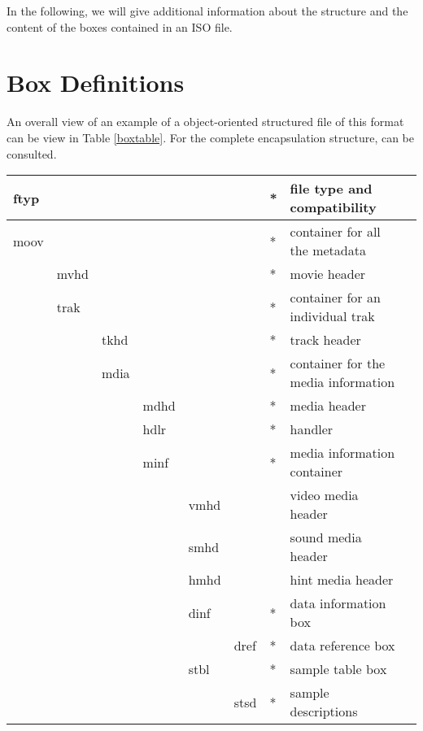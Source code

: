 In the following, we will give additional information about the structure and the content of the boxes contained in an ISO file.

\section{Box Definitions}

An overall view of an example of a object-oriented structured file of this format can be view in Table \ref{boxtable}. For the complete encapsulation structure, \cite{iso} can be consulted.

\begin{table}[]
\centering
\begin{tabular}{|l|l|l|l|l|l|l|l|l}
\hline
  ftyp &      &      &      &      &      & * & file type and compatibility\\ \hline
  moov &      &      &      &      &      & * & container for all the metadata \\ \hline
       & mvhd &      &      &      &      & * & movie header \\ \hline
       & trak &      &      &      &      & * & container for an individual trak \\ \hline
       &      & tkhd &      &      &      & * & track header\\ \hline
       &      & mdia &      &      &      & * & container for the media information \\ \hline
       &      &      & mdhd &      &      & * & media header \\ \hline
       &      &      & hdlr &      &      & * & handler \\ \hline
       &      &      & minf &      &      & * & media information container \\ \hline
       &      &      &      & vmhd &      &   & video media header \\ \hline
       &      &      &      & smhd &      &   & sound media header \\ \hline
       &      &      &      & hmhd &      &   & hint media header \\ \hline
       &      &      &      & dinf &      & * & data information box \\ \hline
       &      &      &      &      & dref & * & data reference box \\ \hline
       &      &      &      & stbl &      & * & sample table box \\ \hline
       &      &      &      &      & stsd & * & sample descriptions \\ \hline

\end{tabular}
\end{table}
